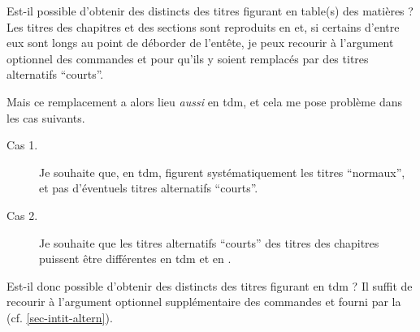 \begin{dbfaq}{Est-il possible d'obtenir des  distincts
    des titres figurant en table(s) des matières ?}{}
  Les titres des chapitres et des sections sont reproduits en
   et, si certains d'entre eux sont longs au point de
  déborder de l'entête, je peux recourir à l'argument optionnel des commandes
   et  pour qu'ils y soient
  remplacés par des titres alternatifs \enquote{courts}.

  Mais ce remplacement a alors lieu \emph{aussi} en \gls{tdm}, et cela me pose
  problème dans les cas suivants.
  \begin{description}
  \item[Cas 1.] Je souhaite que, en \gls{tdm}, figurent systématiquement les
    titres \enquote{normaux}, et pas d'éventuels titres alternatifs
    \enquote{courts}.
  \item[Cas 2.] Je souhaite que les titres alternatifs \enquote{courts} des
    titres des chapitres puissent être différentes en \gls{tdm} et en
    .
  \end{description}
  Est-il donc possible d'obtenir des  distincts des
  titres figurant en \gls{tdm} ?%
  \tcblower
  Il suffit de recourir à l'argument optionnel supplémentaire des commandes
   et  fourni par la \yatCl{}
  (cf. \vref{sec-intit-altern}).

\end{dbfaq}

